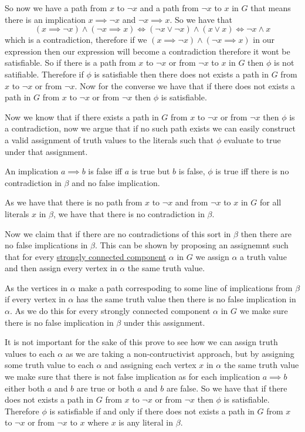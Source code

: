 \documentclass[addpoints]{exam}
\begin{document}
\begin{questions}
\begin{solution}
        So now we have a path from $x$ to $\neg x$ and a path from $\neg x$ to $x$ in $G$ that means there is an implication $x \implies \neg x$ and $\neg x \implies x$. So we have that 
        \[(x \implies \neg x) \land (\neg x \implies x)\iff (\neg x \lor \neg x) \land (x \lor x)\iff \neg x \land x\]
        which is a contradiction, therefore if we $(x \implies \neg x) \land (\neg x \implies x)$ in our expression then our expression will become a contradiction therefore it wont be satisfiable. So if there is a path from $x$ to $\neg x$ or from $\neg x$ to $x$ in $G$ then $\phi$ is not satifiable. Therefore if $\phi$ is satisfiable then there does not exists a path in $G$ from $x$ to $\neg x$ or from $\neg x$. Now for the converse we have that if there does not exists a path in $G$ from $x$ to $\neg x$ or from $\neg x$ then $\phi$ is satisfiable.
        
        Now we know that if there exists a path in $G$ from $x$ to $\neg x$ or from $\neg x$ then $\phi$ is a contradiction, now we argue that if no such path exists we can easily construct a valid assignment of truth values to the literals such that $\phi$ evaluate to true under that assignment.
        
        An implication $a \implies b$ is false iff $a$ is true but $b$ is false, $\phi$ is true iff there is no contradiction in $\beta$ and no false implication. 
        
        As we have that there is no path from $x$ to $\neg x$ and from $\neg x$ to $x$ in $G$ for all literals $x$ in $\beta$, we have that there is no contradiction in $\beta$.
        
        Now we claim that if there are no contradictions of this sort in $\beta$ then there are no false implications in $\beta$. This can be shown by proposing an assignemnt such that for every \href{https://en.wikipedia.org/wiki/Strongly_connected_component}{strongly connected component} $\alpha$ in $G$ we assign $\alpha$ a truth value and then assign every vertex in $\alpha$ the same truth value.
        
        As the vertices in $\alpha$ make a path correspoding to some line of implications from $\beta$ if every vertex in $\alpha$ has the same truth value then there is no false implication in $\alpha$. As we do this for every strongly connected component $\alpha$ in $G$ we make sure there is no false implication in $\beta$ under this assignment.
        
        It is not important for the sake of this prove to see how we can assign truth values to each $\alpha$ as we are taking a non-contructivist approach, but by assigning some truth value to each $\alpha$ and assigning each vertex $x$ in $\alpha$ the same truth value we make sure that there is not false implication as for each implication $a \implies b$ either both $a$ and $b$ are true or both $a$ and $b$ are false. So we have that if there does not exists a path in $G$ from $x$ to $\neg x$ or from $\neg x$ then $\phi$ is satisfiable. Therefore $\phi$ is satisfiable if and only if there does not exists a path in $G$ from $x$ to $\neg x$ or from $\neg x$ to $x$ where $x$ is any literal in $\beta$.
        

\end{solution}
\end{questions}
\end{document}
